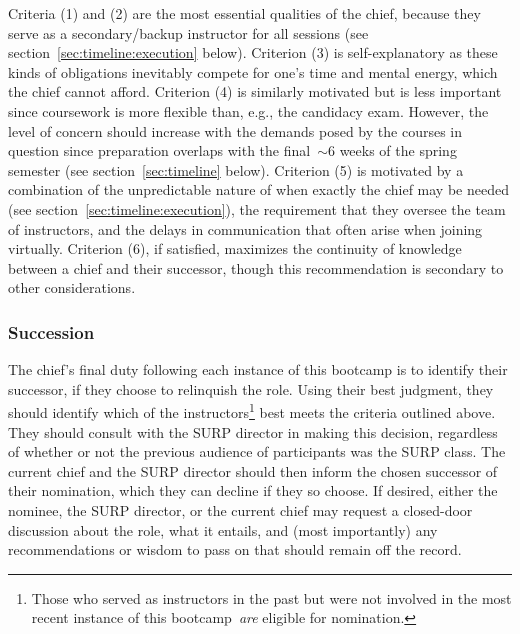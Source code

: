 Criteria (1) and (2) are the most essential qualities of the chief, because
they serve as a secondary/backup instructor for all sessions (see
section~\ref{sec:timeline:execution} below).
Criterion (3) is self-explanatory as these kinds of obligations inevitably
compete for one's time and mental energy, which the chief cannot afford.
Criterion (4) is similarly motivated but is less important since coursework is
more flexible than, e.g., the candidacy exam.
However, the level of concern should increase with the demands posed by the
courses in question since preparation overlaps with the final~$\sim$6 weeks of
the spring semester (see section~\ref{sec:timeline} below).
Criterion (5) is motivated by a combination of the unpredictable nature of when
exactly the chief may be needed (see section~\ref{sec:timeline:execution}), the
requirement that they oversee the team of instructors, and the delays in
communication that often arise when joining virtually.
Criterion (6), if satisfied, maximizes the continuity of knowledge between a
chief and their successor, though this recommendation is secondary to other
considerations.

\subsubsection{Succession}
\label{sec:instructors:chief:succession}
\noindent
The chief’s final duty following each instance of this bootcamp is to identify
their successor, if they choose to relinquish the role.
Using their best judgment, they should identify which of the
instructors\footnote{
	Those who served as instructors in the past but were not involved in the
	most recent instance of this bootcamp~\textit{are} eligible for nomination.
} best meets the criteria outlined above.
They should consult with the SURP director in making this decision, regardless
of whether or not the previous audience of participants was the SURP class.
The current chief and the SURP director should then inform the chosen successor
of their nomination, which they can decline if they so choose.
If desired, either the nominee, the SURP director, or the current chief may
request a closed-door discussion about the role, what it entails, and (most
importantly) any recommendations or wisdom to pass on that should remain off
the record.

